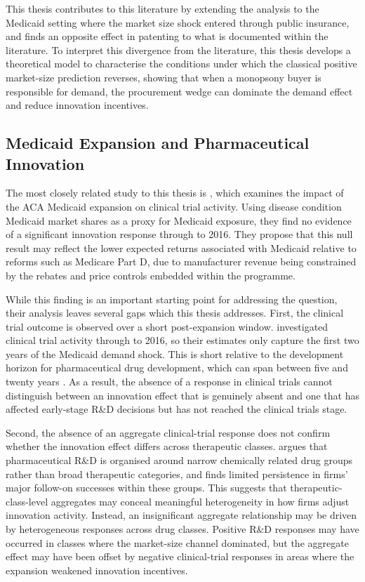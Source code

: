 \documentclass[12pt]{article}
\begin{document}
This thesis contributes to this literature by extending the analysis to the Medicaid setting where the market size shock entered through public insurance, and finds an opposite effect in patenting to what is documented within the literature. To interpret this divergence from the literature, this thesis develops a theoretical model to characterise the conditions under which the classical positive market-size prediction reverses, showing that when a monopsony buyer is responsible for demand, the procurement wedge can dominate the demand effect and reduce innovation incentives.

\subsection{Medicaid Expansion and Pharmaceutical Innovation}

The most closely related study to this thesis is \cite{NBERw28755}, which examines the impact of the ACA Medicaid expansion on clinical trial activity. Using disease condition Medicaid market shares as a proxy for Medicaid exposure, they find no evidence of a significant innovation response through to 2016. They propose that this null result may reflect the lower expected returns associated with Medicaid relative to reforms such as Medicare Part D, due to manufacturer revenue being constrained by the rebates and price controls embedded within the programme.

While this finding is an important starting point for addressing the question, their analysis leaves several gaps which this thesis addresses. First, the clinical trial outcome is observed over a short post-expansion window. \citeauthor{NBERw28755} investigated clinical trial activity through to 2016, so their estimates only capture the first two years of the Medicaid demand shock. This is short relative to the development horizon for pharmaceutical drug development, which can span between five and twenty years \citep{brown2022clinical}. As a result, the absence of a response in clinical trials cannot distinguish between an innovation effect that is genuinely absent and one that has affected early-stage R\&D decisions but has not reached the clinical trials stage.

Second, the absence of an aggregate clinical-trial response does not confirm whether the innovation effect differs across therapeutic classes. \citet{sutton1998technology} argues that pharmaceutical R\&D is organised around narrow chemically related drug groups rather than broad therapeutic categories, and finds limited persistence in firms' major follow-on successes within these groups. This suggests that therapeutic-class-level aggregates may conceal meaningful heterogeneity in how firms adjust innovation activity. Instead, an insignificant aggregate relationship may be driven by heterogeneous responses across drug classes. Positive R\&D responses may have occurred in classes where the market-size channel dominated, but the aggregate effect may have been offset by negative clinical-trial responses in areas where the expansion weakened innovation incentives.
\end{document}

